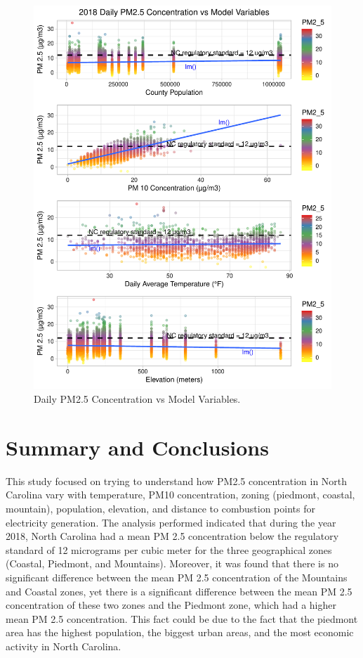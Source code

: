 \documentclass[12pt,]{article}
\begin{document}
\begin{figure}
\centering
\includegraphics{Raby_ENV872_Project_files/figure-latex/unnamed-chunk-60-1.pdf}
\caption{Daily PM2.5 Concentration vs Model Variables.
\label{Final_plot}}
\end{figure}

\newpage

\section{Summary and Conclusions}\label{summary-and-conclusions}

This study focused on trying to understand how PM2.5 concentration in
North Carolina vary with temperature, PM10 concentration, zoning
(piedmont, coastal, mountain), population, elevation, and distance to
combustion points for electricity generation. The analysis performed
indicated that during the year 2018, North Carolina had a mean PM 2.5
concentration below the regulatory standard of 12 micrograms per cubic
meter for the three geographical zones (Coastal, Piedmont, and
Mountains). Moreover, it was found that there is no significant
difference between the mean PM 2.5 concentration of the Mountains and
Coastal zones, yet there is a significant difference between the mean PM
2.5 concentration of these two zones and the Piedmont zone, which had a
higher mean PM 2.5 concentration. This fact could be due to the fact
that the piedmont area has the highest population, the biggest urban
areas, and the most economic activity in North Carolina.
\end{document}
